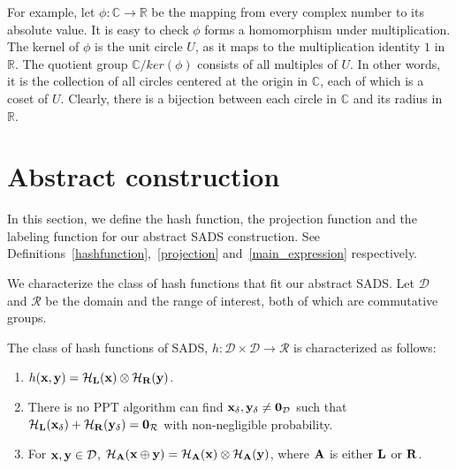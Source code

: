 For example, let $\phi: \mathbb{C} \rightarrow \mathbb{R}$ be the mapping from every complex number to its absolute value. It is easy to check $\phi$ forms a homomorphism under multiplication. The kernel of $\phi$ is the unit circle $U$, as it maps to the multiplication identity $1$ in $\mathbb{R}$. The quotient group $\mathbb{C} / ker(\phi)$ consists of all multiples of $U$. In other words, it is the collection of all circles centered at the origin in $\mathbb{C}$, each of which is a coset of $U$. Clearly, there is a bijection between each circle in $\mathbb{C}$ and its radius in $\mathbb{R}$. 



\section{Abstract construction}\label{abstract_construction}
In this section, we define the hash function, the projection function and the labeling function for our abstract SADS construction. See Definitions~\ref{hashfunction},~\ref{projection} and~\ref{main_expression} respectively. 

We characterize the class of hash functions that fit our abstract SADS. Let $\mathcal{D}$ and $\mathcal{R}$ be the domain and the range of interest, both of which are commutative groups.
\begin{defn}\label{hashfunction}
The class of hash functions of SADS, $h: \mathcal{D} \times \mathcal{D} \to \mathcal{R}$ is characterized as follows:
\begin{enumerate}
\item $h({\bf x, y}) = {\bf {\cal H}_{L}(x)} \otimes {\bf {\cal H}_{R}(y)}$.
\item There is no PPT algorithm can find $\bf x_{\delta}, y_{\delta} \neq 0_{\mathcal{D}}$ such that $\bf {\cal H}_{L}(x_{\delta}) + {\cal H}_{R}(y_{\delta})= {\bf 0}_{\mathcal{R}}$ with non-negligible probability.\label{CR}
\item For ${\bf x,y} \in \mathcal{D}$, ${\bf {\cal H}_{A}}({\bf x \oplus y}) ={\bf {\cal H}_{A}}({\bf x}) \otimes {\bf {\cal H}_{A}}({\bf y})$,  where $\bf A$ is either $\bf L$ or $\bf R$.
\end{enumerate}
\end{defn}

